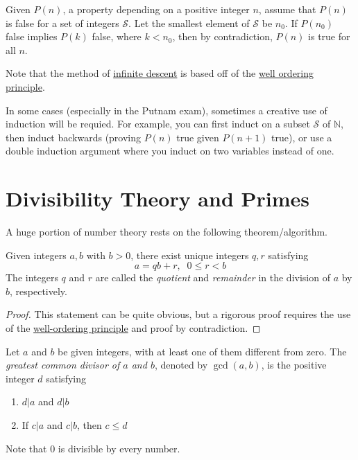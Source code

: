 \documentclass{article}
\newcounter{theorem}[section]
\newcounter{definition}[section]
\newcounter{example}[section]
\begin{document}
\begin{theorem}
  \label{thm:infinite-descent}
Given $P(n)$, a property depending on a positive integer $n$, assume that $P(n)$ is false for a set of integers $\mathcal{S}$. Let the smallest element of $\mathcal{S}$ be $n_0$. If $P(n_0)$ false implies $P(k)$ false, where $k < n_0$, then by contradiction, $P(n)$ is true for all $n$. 
\end{theorem}
Note that the method of \hyperref[thm:infinite-descent]{infinite descent} is based off of the \hyperref[st-thm:well-ordering-principle]{well ordering principle}. 

In some cases (especially in the Putnam exam), sometimes a creative use of induction will be requied. For example, you can first induct on a subset $\mathcal{S}$ of $\mathbb{N}$, then induct backwards (proving $P(n)$ true given $P(n+1)$ true), or use a double induction argument where you induct on two variables instead of one.

\section{Divisibility Theory and Primes}
A huge portion of number theory rests on the following theorem/algorithm. 

\begin{theorem}
  \label{thm:division-algorithm}
Given integers $a, b$ with $b > 0$, there exist unique integers $q, r$ satisfying
\begin{equation}
  a = q b + r, \;\; 0 \leq r < b
\end{equation}
The integers $q$ and $r$ are called the \textit{quotient} and \textit{remainder} in the division of $a$ by $b$, respectively. 
\end{theorem}
\begin{proof}
This statement can be quite obvious, but a rigorous proof requires the use of the \hyperref[thm:well-ordering-principle]{well-ordering principle} and proof by contradiction. 
\end{proof}

\begin{definition}
  \label{def:greatest-common-divisor}
Let $a$ and $b$ be given integers, with at least one of them different from zero. The \textit{greatest common divisor of $a$ and $b$}, denoted by $\gcd(a, b)$, is the positive integer $d$ satisfying
\begin{enumerate}
    \item $d |a$ and $d|b$
    \item If $c|a$ and $c|b$, then $c \leq d$ 
\end{enumerate}
Note that $0$ is divisible by every number. 
\end{definition}
\end{document}
